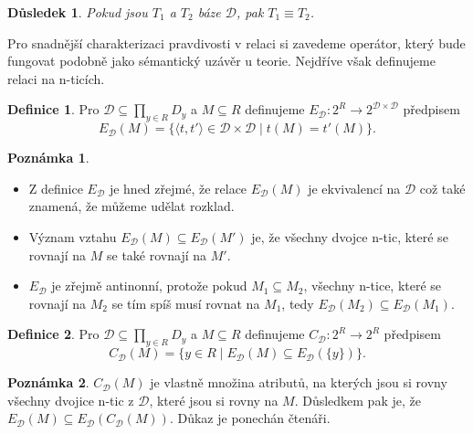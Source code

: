 \documentclass{article}
\newtheorem*{corollary}{Důsledek}
\theoremstyle {definition}
\newtheorem{definition}{Definice}
\newtheorem*{remark}{Poznámka}
\begin{document}
\begin {corollary}
  Pokud jsou $T_1$ a $T_2$ báze $\mathcal D$, pak $T_1\equiv T_2$.
\end {corollary}

Pro snadnější charakterizaci pravdivosti v relaci si zavedeme
operátor, který bude fungovat podobně jako sémantický uzávěr u
teorie. Nejdříve však definujeme relaci na n-ticích.

\begin{definition}
  Pro $\mathcal{D}\subseteq \prod_{y\in R}D_y$ a $M\subseteq R$
  definujeme $E_{\mathcal{D}}: 2^R \rightarrow 2^{\mathcal{D} \times
    \mathcal{D}}$ předpisem
  $$E_{\mathcal{D}}(M)= \{\langle t, t'\rangle\in \mathcal
  D\times \mathcal D \mid t(M)=t'(M)\}.$$
\end{definition}

\begin{remark}
\begin {itemize}
\item
  Z definice $E_{\mathcal{D}}$ je hned zřejmé, že relace
  $E_{\mathcal{D}}(M)$ je ekvivalencí na $\mathcal{D}$ což také
  znamená, že můžeme udělat rozklad.

\item
  Význam vztahu $E_{\mathcal{D}}(M)\subseteq E_{\mathcal{D}}(M')$ je,
  že všechny dvojce n-tic, které se rovnají na $M$ se také rovnají na
  $M'$.

\item
  $E_{\mathcal{D}}$ je zřejmě antinonní, protože pokud $M_1\subseteq
  M_2$, všechny n-tice, které se rovnají na $M_2$ se tím spíš musí
  rovnat na $M_1$, tedy $E_{\mathcal{D}}(M_2)\subseteq
  E_{\mathcal{D}}(M_1)$.
\end {itemize}
\end{remark}

\begin {definition}
  Pro $\mathcal{D}\subseteq \prod_{y\in R}D_y$ a $M\subseteq R$
  definujeme $C_{\mathcal D}: 2^R \rightarrow 2^R$ předpisem
  $$C_{\mathcal{D}}(M) = \{y \in R \mid E_{\mathcal{D}}(M) \subseteq
  E_{\mathcal{D}}(\{y\})\}.$$
\end {definition}
\begin {remark}
  $C_{\mathcal D}(M)$ je vlastně množina atributů, na kterých jsou si
  rovny všechny dvojice n-tic z $\mathcal{D}$, které jsou si rovny na
  $M$. Důsledkem pak je, že $E_{\mathcal{D}}(M)\subseteq
  E_{\mathcal{D}}(C_{\mathcal D}(M))$. Důkaz je ponechán čtenáři.
\end {remark}
\end{document}
